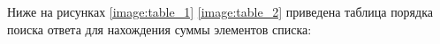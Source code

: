 Ниже на рисунках \ref{image:table_1} \ref{image:table_2} приведена таблица порядка поиска ответа для нахождения суммы элементов списка:
\begin{figure}[H]
\end{figure}

